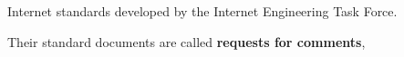 \begin{note}[IETF]
    Internet standards developed by the Internet Engineering Task Force. 

    Their standard documents are called \textbf{requests for comments},
    
\end{note}






\newpage




